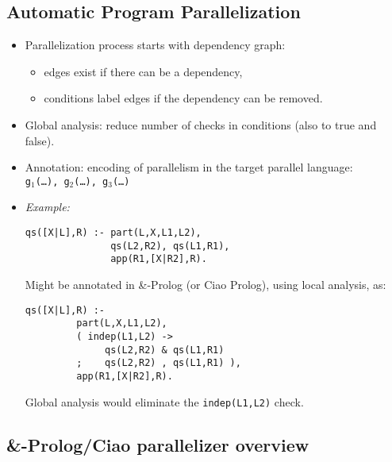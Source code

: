 \documentclass{article}
\renewcommand{\_}{\char'137}
\begin{document}
\subsection{Automatic Program Parallelization}

\begin{itemize}
\item Parallelization process \cite{effofai-toplas} starts with
  dependency graph:  
\begin{itemize}
\item edges exist if there can be a dependency,
\item conditions label edges if the dependency can be removed.
\end{itemize}

\item Global analysis:
reduce number of checks in conditions (also to true and false).

\item Annotation: encoding of parallelism in the target parallel
  language:\\[3mm] 
      {\tt g$_1$(\ldots), g$_2$(\ldots), g$_3$(\ldots)}\\

\centerline{}

\item {\em Example:}
\begin{verbatim}
qs([X|L],R) :- part(L,X,L1,L2), 
               qs(L2,R2), qs(L1,R1), 
               app(R1,[X|R2],R).
\end{verbatim}
Might be annotated in \&-Prolog (or Ciao Prolog), using local analysis, as:
\begin{verbatim}
qs([X|L],R) :- 
         part(L,X,L1,L2), 
         ( indep(L1,L2) -> 
              qs(L2,R2) & qs(L1,R1)
         ;    qs(L2,R2) , qs(L1,R1) ), 
         app(R1,[X|R2],R). 
\end{verbatim}
Global analysis would eliminate the \texttt{indep(L1,L2)} check.
\end{itemize}

\subsection{\&-Prolog/Ciao parallelizer overview}
\end{document}

